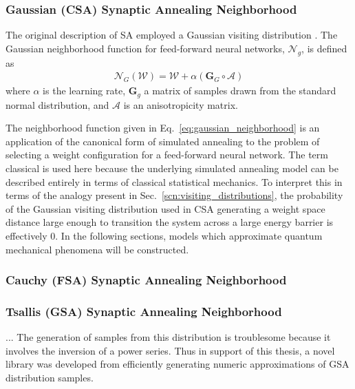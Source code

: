 \documentclass[11pt]{afthesis}
\begin{document}
	\subsubsection{Gaussian (CSA) Synaptic Annealing Neighborhood}
	
	The original description of SA employed a Gaussian visiting distribution \cite{kirkpatrick1983}. The Gaussian neighborhood function for feed-forward neural networks, \begin{math}\mathcal{N}_{g}\end{math}, is defined as \begin{align}\label{eq:gaussian_neighborhood}
	\mathcal{N}_{G} (\boldsymbol{\mathcal{W}}) =  \boldsymbol{\mathcal{W}} + \alpha (\boldsymbol{G}_G  \circ\boldsymbol{\mathcal{A}})
	\end{align}
	\noindent where $\alpha$ is the learning rate, $\boldsymbol{G}_g$ a matrix of samples drawn from the standard normal distribution, and $\boldsymbol{\mathcal{A}}$ is an anisotropicity matrix.
	
	
	The neighborhood function given in Eq.~\ref{eq:gaussian_neighborhood} is an application of the canonical form of simulated annealing to the problem of selecting a weight configuration for a feed-forward neural network. The term classical is used here because the underlying simulated annealing model can be described entirely in terms of classical statistical mechanics. To interpret this in terms of the analogy present in Sec.~\ref{scn:visiting_distributions}, the probability of the Gaussian visiting distribution used in CSA generating a weight space distance large enough to transition the system across a large energy barrier is effectively $0$. In the following sections, models which approximate quantum mechanical phenomena will be constructed.
	
	\subsubsection{Cauchy (FSA) Synaptic Annealing Neighborhood}
	
	\subsubsection{Tsallis (GSA) Synaptic Annealing Neighborhood}
	
	
	... The generation of samples from this distribution is troublesome because it involves the inversion of a power series. Thus in support of this thesis, a novel library was developed from efficiently generating numeric approximations of GSA distribution samples.
	
\end{document}
